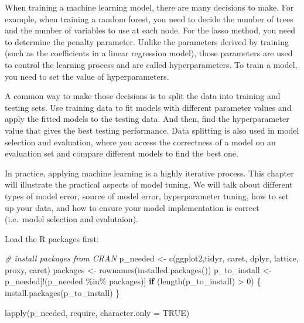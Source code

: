 \documentclass[
  12pt,
]{krantz}
\makeatletter
\newenvironment{Shaded}{\begin{snugshade}}{\end{snugshade}}
\newcommand{\AttributeTok}[1]{\textcolor[rgb]{0.61,0.61,0.61}{#1}}
\newcommand{\CommentTok}[1]{\textcolor[rgb]{0.37,0.37,0.37}{\textit{#1}}}
\newcommand{\ConstantTok}[1]{\textcolor[rgb]{0,0,0}{#1}}
\newcommand{\ControlFlowTok}[1]{\textcolor[rgb]{0.27,0.27,0.27}{\textbf{#1}}}
\newcommand{\DecValTok}[1]{\textcolor[rgb]{0.06,0.06,0.06}{#1}}
\newcommand{\FunctionTok}[1]{\textcolor[rgb]{0,0,0}{#1}}
\newcommand{\NormalTok}[1]{#1}
\newcommand{\OtherTok}[1]{\textcolor[rgb]{0.37,0.37,0.37}{#1}}
\newcommand{\SpecialCharTok}[1]{\textcolor[rgb]{0,0,0}{#1}}
\newcommand{\StringTok}[1]{\textcolor[rgb]{0.5,0.5,0.5}{#1}}
\newenvironment{kframe}{%
\medskip{}
\setlength{\fboxsep}{.8em}
 \def\at@end@of@kframe{}%
 \ifinner\ifhmode%
  \def\at@end@of@kframe{\end{minipage}}%
  \begin{minipage}{\columnwidth}%
 \fi\fi%
 \def\FrameCommand##1{\hskip\@totalleftmargin \hskip-\fboxsep
 \colorbox{shadecolor}{##1}\hskip-\fboxsep
     \hskip-\linewidth \hskip-\@totalleftmargin \hskip\columnwidth}%
 \MakeFramed {\advance\hsize-\width
   \@totalleftmargin\z@ \linewidth\hsize
   \@setminipage}}%
 {\par\unskip\endMakeFramed%
 \at@end@of@kframe}
\renewenvironment{Shaded}{\begin{kframe}}{\end{kframe}}
\makeatother
\begin{document}
When training a machine learning model, there are many decisions to make. For example, when training a random forest, you need to decide the number of trees and the number of variables to use at each node. For the lasso method, you need to determine the penalty parameter. Unlike the parameters derived by training (such as the coefficients in a linear regression model), those parameters are used to control the learning process and are called hyperparameters. To train a model, you need to set the value of hyperparameters.

A common way to make those decisions is to split the data into training and testing sets. Use training data to fit models with different parameter values and apply the fitted models to the testing data. And then, find the hyperparameter value that gives the best testing performance. Data splitting is also used in model selection and evaluation, where you access the correctness of a model on an evaluation set and compare different models to find the best one.

In practice, applying machine learning is a highly iterative process. This chapter will illustrate the practical aspects of model tuning. We will talk about different types of model error, source of model error, hyperparameter tuning, how to set up your data, and how to ensure your model implementation is correct (i.e.~model selection and evalutaion).

Load the R packages first:

\begin{Shaded}
\begin{Highlighting}[]
\CommentTok{\# install packages from CRAN}
\NormalTok{p\_needed }\OtherTok{\textless{}{-}} \FunctionTok{c}\NormalTok{(}\StringTok{\textquotesingle{}ggplot2\textquotesingle{}}\NormalTok{,}\StringTok{\textquotesingle{}tidyr\textquotesingle{}}\NormalTok{, }\StringTok{\textquotesingle{}caret\textquotesingle{}}\NormalTok{, }\StringTok{\textquotesingle{}dplyr\textquotesingle{}}\NormalTok{, }
              \StringTok{\textquotesingle{}lattice\textquotesingle{}}\NormalTok{, }\StringTok{\textquotesingle{}proxy\textquotesingle{}}\NormalTok{, }\StringTok{\textquotesingle{}caret\textquotesingle{}}\NormalTok{)}
\NormalTok{packages }\OtherTok{\textless{}{-}} \FunctionTok{rownames}\NormalTok{(}\FunctionTok{installed.packages}\NormalTok{())}
\NormalTok{p\_to\_install }\OtherTok{\textless{}{-}}\NormalTok{ p\_needed[}\SpecialCharTok{!}\NormalTok{(p\_needed }\SpecialCharTok{\%in\%}\NormalTok{ packages)]}
\ControlFlowTok{if}\NormalTok{ (}\FunctionTok{length}\NormalTok{(p\_to\_install) }\SpecialCharTok{\textgreater{}} \DecValTok{0}\NormalTok{) \{}
    \FunctionTok{install.packages}\NormalTok{(p\_to\_install)}
\NormalTok{\}}

\FunctionTok{lapply}\NormalTok{(p\_needed, require, }\AttributeTok{character.only =} \ConstantTok{TRUE}\NormalTok{)}
\end{Highlighting}
\end{Shaded}
\end{document}
